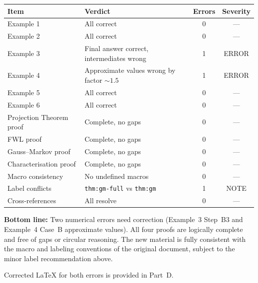 \begin{center}
\renewcommand{\arraystretch}{1.3}
\begin{tabular}{llcc}
\toprule
Item & Verdict & Errors & Severity \\
\midrule
Example 1 & All correct & 0 & --- \\
Example 2 & All correct & 0 & --- \\
Example 3 & Final answer correct, intermediates wrong & 1 & ERROR \\
Example 4 & Approximate values wrong by factor $\sim 1.5$ & 1 & ERROR \\
Example 5 & All correct & 0 & --- \\
Example 6 & All correct & 0 & --- \\
\midrule
Projection Theorem proof & Complete, no gaps & 0 & --- \\
FWL proof & Complete, no gaps & 0 & --- \\
Gauss--Markov proof & Complete, no gaps & 0 & --- \\
Characterisation proof & Complete, no gaps & 0 & --- \\
\midrule
Macro consistency & No undefined macros & 0 & --- \\
Label conflicts & \verb|thm:gm-full| vs \verb|thm:gm| & 1 & NOTE \\
Cross-references & All resolve & 0 & --- \\
\bottomrule
\end{tabular}
\end{center}

\medskip
\noindent\textbf{Bottom line:} Two numerical errors need correction
(Example~3 Step~B3 and Example~4 Case~B approximate values).  All four
proofs are logically complete and free of gaps or circular reasoning.
The new material is fully consistent with the macro and labeling
conventions of the original document, subject to the minor label
recommendation above.

\noindent Corrected \LaTeX{} for both errors is provided in Part~D.
